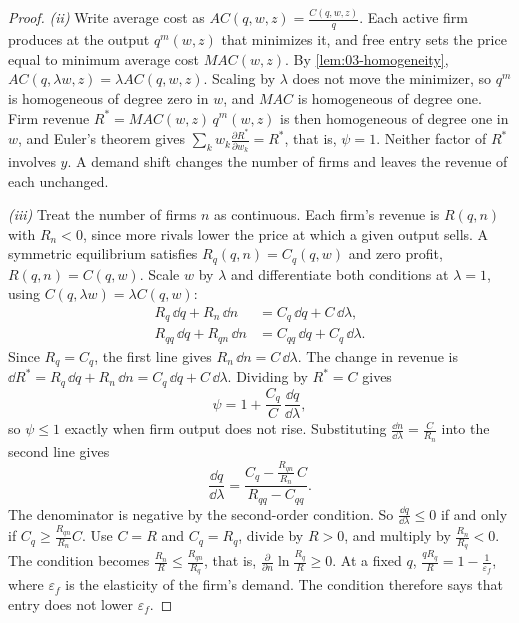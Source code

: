 \begin{proof}
\emph{(ii)} Write average cost as $AC(q, w, z) = \frac{C(q, w, z)}{q}$. Each active firm produces at the output
$q^m(w, z)$ that minimizes it, and free entry sets the price equal to minimum average cost $MAC(w, z)$. By
\cref{lem:03-homogeneity}, $AC(q, \lambda w, z) = \lambda AC(q, w, z)$. Scaling by $\lambda$ does not move the
minimizer, so $q^m$ is homogeneous of degree zero in $w$, and $MAC$ is homogeneous of degree one. Firm revenue
$R^* = MAC(w, z)\, q^m(w, z)$ is then homogeneous of degree one in $w$, and Euler's theorem gives $\sum_k w_k
\frac{\partial R^*}{\partial w_k} = R^*$, that is, $\psi = 1$. Neither factor of $R^*$ involves $y$. A demand
shift changes the number of firms and leaves the revenue of each unchanged.

\emph{(iii)} Treat the number of firms $n$ as continuous. Each firm's revenue is $R(q, n)$ with $R_n < 0$,
since more rivals lower the price at which a given output sells. A symmetric equilibrium satisfies
$R_q(q, n) = C_q(q, w)$ and zero profit, $R(q, n) = C(q, w)$. Scale $w$ by $\lambda$ and differentiate both
conditions at $\lambda = 1$, using $C(q, \lambda w) = \lambda C(q, w)$:
\begin{align*}
  R_q\, \dd q + R_n\, \dd n &= C_q\, \dd q + C\, \dd\lambda, \\
  R_{qq}\, \dd q + R_{qn}\, \dd n &= C_{qq}\, \dd q + C_q\, \dd\lambda .
\end{align*}
Since $R_q = C_q$, the first line gives $R_n\, \dd n = C\, \dd\lambda$. The change in revenue is $\dd R^* = R_q\, \dd q +
R_n\, \dd n = C_q\, \dd q + C\, \dd\lambda$. Dividing by $R^* = C$ gives
\begin{equation*}
  \psi = 1 + \frac{C_q}{C}\,\frac{\dd q}{\dd\lambda},
\end{equation*}
so $\psi \le 1$ exactly when firm output does not rise. Substituting $\frac{\dd n}{\dd\lambda} = \frac{C}{R_n}$
into the second line gives
\begin{equation*}
  \frac{\dd q}{\dd\lambda} = \frac{C_q - \frac{R_{qn}}{R_n}\, C}{R_{qq} - C_{qq}} .
\end{equation*}
The denominator is negative by the second-order condition. So $\frac{\dd q}{\dd\lambda} \le 0$ if and only if $C_q
\ge \frac{R_{qn}}{R_n}C$. Use $C = R$ and $C_q = R_q$, divide by $R > 0$, and multiply by
$\frac{R_n}{R_q} < 0$. The condition becomes $\frac{R_n}{R} \le \frac{R_{qn}}{R_q}$, that is,
$\frac{\partial}{\partial n}\ln\frac{R_q}{R} \ge 0$. At a fixed $q$, $\frac{q R_q}{R} = 1 -
\frac{1}{\varepsilon_f}$, where $\varepsilon_f$ is the elasticity of the firm's demand. The condition
therefore says that entry does not lower $\varepsilon_f$.
\end{proof}

